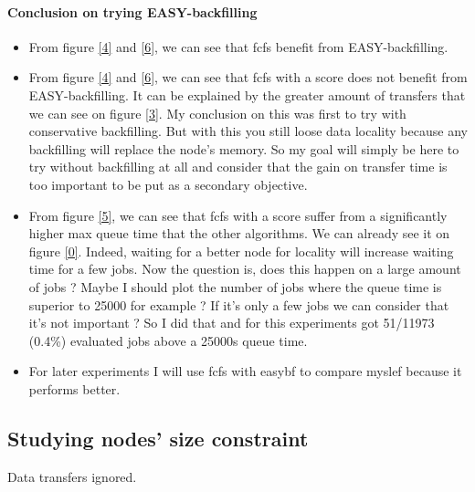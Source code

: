 \documentclass[a4paper]{article}
\begin{document}
\paragraph {Conclusion on trying EASY-backfilling}
\begin{itemize}
	\item From figure \ref{4} and \ref{6}, we can see that fcfs benefit from EASY-backfilling.
	\item From figure \ref{4} and \ref{6}, we can see that fcfs with a score does not benefit from EASY-backfilling. It can be explained by the greater amount of transfers that we can see on figure \ref{3}. My conclusion on this was first to 
	try with conservative backfilling. But with this you still loose data locality because any backfilling will replace the node's memory. So my goal will simply be here to try without backfilling at all and consider that the gain on transfer time is too important to be put as a secondary objective.
	\item From figure \ref{5}, we can see that fcfs with a score suffer from a significantly higher max queue time that the other algorithms. We can already see it on figure \ref{0}. Indeed, waiting for a better node for locality will increase waiting time for a few jobs. Now the question is, does this happen on a large amount of jobs ? Maybe I should plot the number of jobs where the queue time is superior to 25000 for example ? If it's only a few jobs we can consider that it's not important ? So I did that and for this experiments got 51/11973 (0.4\%) evaluated jobs above a 25000s queue time.
	\item For later experiments I will use fcfs with easybf to compare myslef because it performs better.
\end{itemize}

\subsection{Studying nodes' size constraint}

Data transfers ignored.
\end{document}
